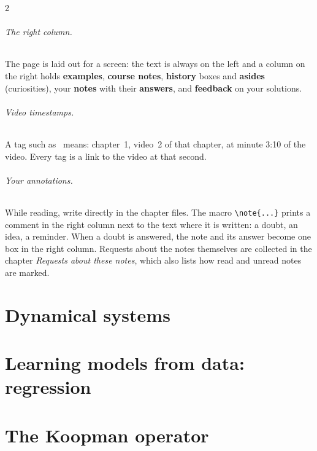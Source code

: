 \documentclass[12pt,oneside,openany]{book}
\begin{document}
\begin{paracol}{2}
\paragraph{The right column.} The page is laid out for a screen: the text is always on the left and a
column on the right holds \textcolor{intcol}{\textbf{examples}}, \textcolor{srccol}{\textbf{course notes}},
\textcolor{histcol}{\textbf{history}} boxes and \textcolor{histcol}{\textbf{asides}} (curiosities), your
\textcolor{notecol!80!black}{\textbf{notes}} with their \textcolor{anscol}{\textbf{answers}}, and
\textcolor{exercol}{\textbf{feedback}} on your solutions.

\paragraph{Video timestamps.} A tag such as \ means: chapter~1, video~2 of that
chapter, at minute 3:10 of the video. Every tag is a link to the video at that second.

\paragraph{Your annotations.} While reading, write directly in the chapter files. The macro
\verb|\note{...}| prints a comment in the right column next to the text where it is written: a doubt,
an idea, a reminder. When a doubt is answered, the note and its answer become one box in the right
column. Requests about the notes themselves are collected in the chapter \emph{Requests about these
notes}, which also lists how read and unread notes are marked.

\flushside
\end{paracol}



\tableofcontents

\mainmatter
\part{Dynamical systems}\label{part:basics}




\part{Learning models from data: regression}\label{part:regression}



\part{The Koopman operator}\label{part:koopman}




\appendix

\end{document}
